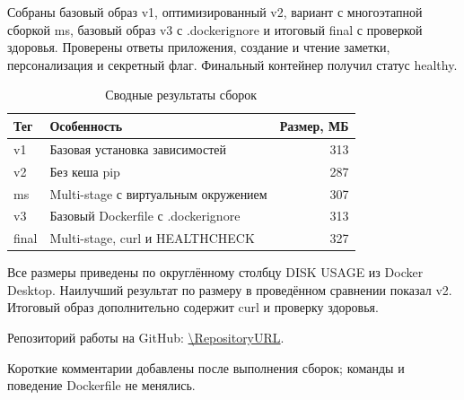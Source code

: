 Собраны базовый образ v1, оптимизированный v2, вариант с многоэтапной сборкой ms, базовый образ v3 с .dockerignore и итоговый final с проверкой здоровья. Проверены ответы приложения, создание и чтение заметки, персонализация и секретный флаг. Финальный контейнер получил статус healthy.
\begin{table}[H]
\caption{Сводные результаты сборок}
\begin{tabularx}{\textwidth}{|l|X|r|}
\hline
Тег & Особенность & Размер, МБ \\\hline
v1 & Базовая установка зависимостей & 313 \\\hline
v2 & Без кеша pip & 287 \\\hline
ms & Multi-stage с виртуальным окружением & 307 \\\hline
v3 & Базовый Dockerfile с .dockerignore & 313 \\\hline
final & Multi-stage, curl и HEALTHCHECK & 327 \\\hline
\end{tabularx}
\end{table}
Все размеры приведены по округлённому столбцу DISK USAGE из Docker Desktop. Наилучший результат по размеру в проведённом сравнении показал v2. Итоговый образ дополнительно содержит curl и проверку здоровья.

\noindent Репозиторий работы на GitHub: \url{\RepositoryURL}.

\startreportappendices
{}
Короткие комментарии добавлены после выполнения сборок; команды и поведение Dockerfile не менялись.
